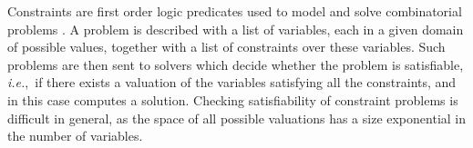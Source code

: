 \documentclass{llncs}
\newcommand{\cp}{\ensuremath{\tt{CP}}}
\newcommand{\ie} {{\em i.e.},\ }
\newcommand{\comment}[2]{{\color{gray}{\small{\underline{#1:} #2}}}}
\newcommand{\anicet}[1]{\marginpar{\comment{Anicet}{#1}}}%
\newcommand{\charlotte}[1]{\marginpar{\comment{Charlotte}{#1}}}%
\newcommand{\custompar}[1]{\smallskip \noindent {\bf #1}}
\begin{document}
\custompar{Constraints.}
Constraints are first order logic predicates used to model and solve combinatorial problems \cite{Rossi2006HCP}. %
A problem is described with a list of variables, each in a given domain of possible values, together
with a list of constraints over these variables. Such problems are then sent to solvers which decide whether the problem is
satisfiable, \ie if there exists a valuation of the variables
satisfying all the constraints, and in this case computes a solution. 
Checking satisfiability of constraint problems is difficult in general, as the space of all possible valuations has a size exponential in the number of variables.
  
\end{document}

